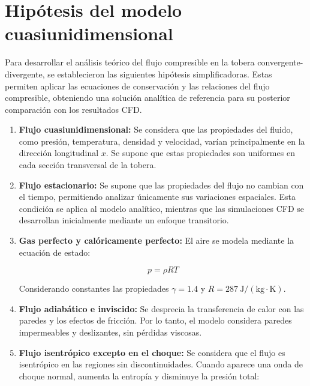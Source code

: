 \documentclass[12pt,letterpaper]{article}
\numberwithin{equation}{section}
\begin{document}
\section{Hipótesis del modelo cuasiunidimensional}

Para desarrollar el análisis teórico del flujo compresible
en la tobera convergente-divergente, se establecieron las
siguientes hipótesis simplificadoras. Estas permiten aplicar
las ecuaciones de conservación y las relaciones del flujo
compresible, obteniendo una solución analítica de referencia
para su posterior comparación con los resultados CFD.

\begin{enumerate}

    \item \textbf{Flujo cuasiunidimensional:}
    Se considera que las propiedades del fluido, como
    presión, temperatura, densidad y velocidad, varían
    principalmente en la dirección longitudinal $x$.
    Se supone que estas propiedades son uniformes en
    cada sección transversal de la tobera.

    \item \textbf{Flujo estacionario:}
    Se supone que las propiedades del flujo no cambian
    con el tiempo, permitiendo analizar únicamente
    sus variaciones espaciales. Esta condición se
    aplica al modelo analítico, mientras que las
    simulaciones CFD se desarrollan inicialmente
    mediante un enfoque transitorio.

    \item \textbf{Gas perfecto y calóricamente perfecto:}
    El aire se modela mediante la ecuación de estado:

    \begin{equation}
        p = \rho RT
    \end{equation}

    Considerando constantes las propiedades
    $\gamma = 1.4$ y
    $R = 287\ \mathrm{J/(kg\cdot K)}$.

    \item \textbf{Flujo adiabático e inviscido:}
    Se desprecia la transferencia de calor con las
    paredes y los efectos de fricción. Por lo tanto,
    el modelo considera paredes impermeables y
    deslizantes, sin pérdidas viscosas.

    \item \textbf{Flujo isentrópico excepto en el choque:}
    Se considera que el flujo es isentrópico en las
    regiones sin discontinuidades. Cuando aparece
    una onda de choque normal, aumenta la entropía
    y disminuye la presión total:


\end{enumerate}
\end{document}
